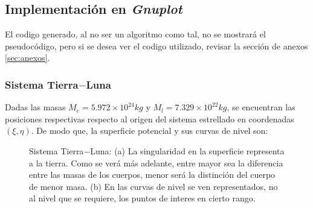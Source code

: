\subsection{Implementación en \textit{Gnuplot}}

El codigo generado, al no ser un algoritmo como tal, no se mostrará el pseudocódigo, pero si se desea ver el codigo utilizado, revisar la sección de anexos \ref{sec:anexos}.

\subsubsection{Sistema Tierra$-$Luna}
Dadas las masas $M_{e} = 5.972\times 10^{24} kg$ y $M_l = 7.329\times 10^{22} kg$, se encuentran las posiciones respectivas respecto al origen del sistema estrellado en coordenadas $(\xi ,\eta)$. De modo que, la superficie potencial y sus curvas de nivel son:

\begin{figure}[H]
\centering
{}\qquad
{}
\caption{Sistema Tierra$-$Luna: (a) La singularidad en la superficie representa a la tierra. Como se verá más adelante, entre mayor sea la diferencia entre las masas de los cuerpos, menor será la distinción del cuerpo de menor masa. (b) En las curvas de nivel se ven representados, no al nivel que se requiere, los puntos de interes en cierto rango.}
\label{fig: surperficie, cn t-l}
\end{figure}



